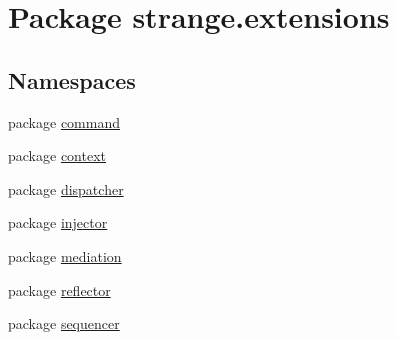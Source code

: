\hypertarget{namespacestrange_1_1extensions}{\section{Package strange.\-extensions}
\label{namespacestrange_1_1extensions}
}
\subsection*{Namespaces}
\begin{DoxyCompactItemize}
\item 
package \hyperlink{namespacestrange_1_1extensions_1_1command}{command}
\item 
package \hyperlink{namespacestrange_1_1extensions_1_1context}{context}
\item 
package \hyperlink{namespacestrange_1_1extensions_1_1dispatcher}{dispatcher}
\item 
package \hyperlink{namespacestrange_1_1extensions_1_1injector}{injector}
\item 
package \hyperlink{namespacestrange_1_1extensions_1_1mediation}{mediation}
\item 
package \hyperlink{namespacestrange_1_1extensions_1_1reflector}{reflector}
\item 
package \hyperlink{namespacestrange_1_1extensions_1_1sequencer}{sequencer}
\end{DoxyCompactItemize}
